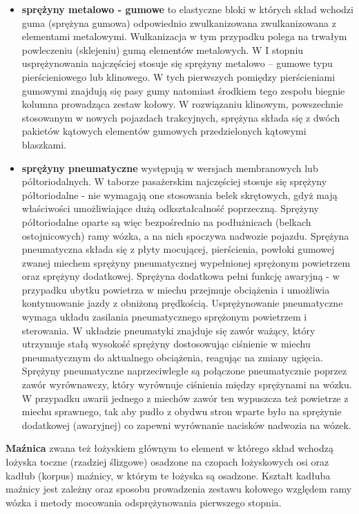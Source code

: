 \begin{itemize}
	\item \textbf{sprężyny metalowo - gumowe} to elastyczne bloki w których skład wchodzi guma (sprężyna gumowa) odpowiednio zwulkanizowana zwulkanizowana z elementami metalowymi. Wulkanizacja w tym przypadku polega na trwałym powleczeniu (sklejeniu) gumą elementów metalowych. 
	W I stopniu usprężynowania najczęściej stosuje się sprężyny metalowo – gumowe typu pierścieniowego lub klinowego. 
	W tych pierwszych pomiędzy pierścieniami gumowymi znajdują się pasy gumy natomiast środkiem tego zespołu biegnie kolumna prowadząca zestaw kołowy. W rozwiązaniu klinowym, powszechnie stosowanym w nowych pojazdach trakcyjnych, sprężyna składa się z dwóch pakietów kątowych elementów gumowych przedzielonych kątowymi blaszkami.  
	\item  \textbf{sprężyny pneumatyczne} występują w wersjach membranowych lub półtoriodalnych. 
	W taborze pasażerskim najczęściej stosuje się sprężyny półtoriodalne - nie wymagają one stosowania belek skrętowych, gdyż mają właściwości umożliwiające dużą odkształcalność poprzeczną. Sprężyny półtoriodalne oparte są więc bezpośrednio na podłużnicach (belkach ostojnicowych) ramy wózka, a na nich spoczywa nadwozie pojazdu. Sprężyna pneumatyczna składa się z płyty mocującej, pierścienia, powłoki gumowej zwanej miechem sprężyny pneumatycznej wypełnionej sprężonym powietrzem oraz sprężyny dodatkowej. Sprężyna dodatkowa pełni funkcję awaryjną - w przypadku ubytku powietrza w miechu przejmuje obciążenia i umożliwia kontynuowanie jazdy z obniżoną prędkością. Usprężynowanie pneumatyczne wymaga układu zasilania pneumatycznego sprężonym powietrzem i sterowania. W układzie pneumatyki znajduje się zawór ważący, który utrzymuje stałą wysokość sprężyny dostosowując ciśnienie w miechu pneumatycznym do aktualnego obciążenia, reagując na zmiany ugięcia. 
	Sprężyny pneumatyczne naprzeciwległe są połączone pneumatycznie poprzez zawór wyrównawczy, który wyrównuje ciśnienia między sprężynami na wózku. W przypadku awarii jednego z miechów zawór ten wypuszcza też powietrze z miechu sprawnego, tak aby pudło z obydwu stron wparte było na sprężynie dodatkowej (awaryjnej) co zapewni wyrównanie nacisków nadwozia na wózek. 
	\end{itemize}

\textbf{Maźnica} zwana też łożyskiem głównym to element w którego skład wchodzą łożyska toczne (rzadziej ślizgowe) osadzone na czopach łożyskowych osi oraz kadłub (korpus) maźnicy, w którym te łożyska są osadzone. Kształt kadłuba maźnicy jest zależny oraz sposobu prowadzenia zestawu kołowego względem ramy wózka i metody mocowania odsprężynowania pierwszego stopnia.

